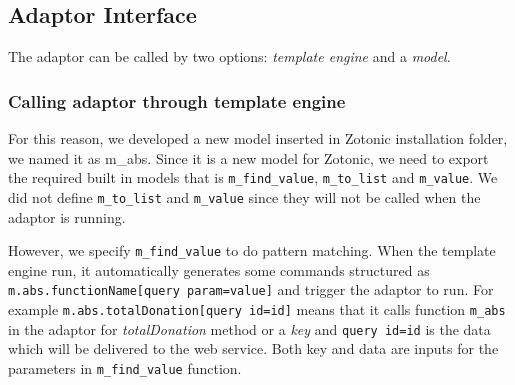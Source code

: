 \documentclass[conference]{IEEEtran}
\begin{document}
%

\subsection{Adaptor Interface}
The adaptor can be called by two options: \textit{template engine} and a \textit{model}. 

\subsubsection{Calling adaptor through template engine}
For this reason, we developed a new model inserted in Zotonic installation folder, we named it as m\_abs. Since it is a new model for Zotonic, we need to export the required built in models that is \texttt{m\_find\_value}, \texttt{m\_to\_list} and \texttt{m\_value}. We did not define \texttt{m\_to\_list} and \texttt{m\_value} since they will not be called when the adaptor is running.

However, we specify \texttt{m\_find\_value} to do pattern matching. When the template engine run, it automatically generates some commands structured as \texttt{m.abs.functionName[{query param=value}]} and trigger the adaptor to run. For example \texttt{{{m.abs.totalDonation[{query id=id}]}}} means that it calls function \texttt{m\_abs} in the adaptor for \textit{totalDonation} method or a \textit{key} and \texttt{{query id=id}} is the data which will be delivered to the web service. Both key and data are inputs for the parameters in \texttt{m\_find\_value} function.
%
%
% 
% 
%  
%  
%
%
\end{document}
